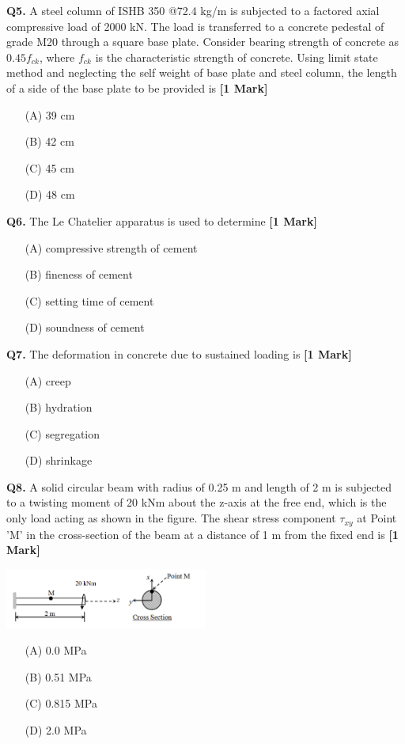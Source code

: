 \documentclass[11pt]{article}
\newcommand{\questiona}[2]{
    \noindent\textbf{Q#2.} #1 \hfill \textbf{[1 Mark]}
}
\begin{document}
\questiona{A steel column of ISHB 350 @72.4 kg/m is subjected to a factored axial compressive load of 2000 kN. The load is transferred to a concrete pedestal of grade M20 through a square base plate. Consider bearing strength of concrete as \( 0.45f_{ck} \), where \( f_{ck} \) is the characteristic strength of concrete. Using limit state method and neglecting the self weight of base plate and steel column, the length of a side of the base plate to be provided is}{5}
\begin{enumerate}
    \item[(A)] 39 cm
    \item[(B)] 42 cm
    \item[(C)] 45 cm
    \item[(D)] 48 cm
\end{enumerate}
\vspace{0.5cm}

\questiona{The Le Chatelier apparatus is used to determine}{6}
\begin{enumerate}
    \item[(A)] compressive strength of cement
    \item[(B)] fineness of cement
    \item[(C)] setting time of cement
    \item[(D)] soundness of cement
\end{enumerate}
\vspace{0.5cm}

\questiona{The deformation in concrete due to sustained loading is}{7}
\begin{enumerate}
    \item[(A)] creep
    \item[(B)] hydration
    \item[(C)] segregation
    \item[(D)] shrinkage
\end{enumerate}
\vspace{0.5cm}

\questiona{A solid circular beam with radius of 0.25 m and length of 2 m is subjected to a twisting moment of 20 kNm about the z-axis at the free end, which is the only load acting as shown in the figure. The shear stress component \( \tau_{xy} \) at Point 'M' in the cross-section of the beam at a distance of 1 m from the fixed end is}{8}
\begin{center}
\includegraphics[width=0.5\textwidth]{figures/Q8a.png}
\end{center}
\begin{enumerate}
    \item[(A)] 0.0 MPa
    \item[(B)] 0.51 MPa
    \item[(C)] 0.815 MPa
    \item[(D)] 2.0 MPa
\end{enumerate}
\vspace{0.5cm}
\end{document}
